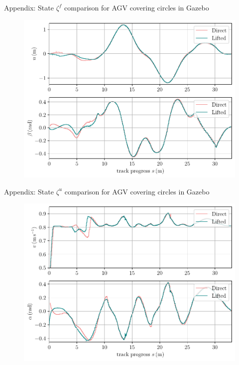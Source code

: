 \documentclass[10pt,aspectratio=1610]{beamer} %
\begin{document}
\begin{frame}{Appendix: State $\zeta^{f}$ comparison for AGV covering circles in Gazebo}
	\begin{figure}[h!tbp]
		\includegraphics[scale=0.65]{figures/zeta_f}
	\end{figure}
\end{frame}

\begin{frame}{Appendix: State $\zeta^{u}$ comparison for AGV covering circles in Gazebo}
	\begin{figure}[h!tbp]
		\includegraphics[scale=0.65]{figures/zeta_u}
	\end{figure}
\end{frame}
\end{document}
